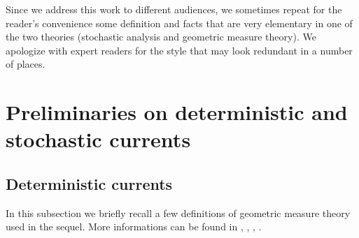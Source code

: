 \documentclass{article}
\begin{document}

Since we address this work to different audiences, we sometimes repeat for
the reader's convenience some definition and facts that are very elementary in
one of the two theories (stochastic analysis and geometric measure theory).
We apologize with expert readers for the style that may look redundant in a
number of places.

\section{Preliminaries on deterministic and stochastic currents}

\subsection{Deterministic currents}

In this subsection we briefly recall a few definitions of geometric measure
theory used in the sequel. More informations can be found in \cite{Fed}, 
\cite{Morgan}, \cite{Simon}, \cite{GMS}.
\end{document}
